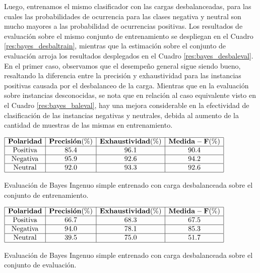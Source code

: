 
Luego, entrenamos el mismo clasificador con las cargas desbalanceadas, para las cuales las probabilidades de ocurrencia para las clases negativa y neutral son mucho mayores a las probabilidad de ocurrencias positivas. Los resultados de evaluaci\'on sobre el mismo conjunto de entrenamiento se despliegan en el Cuadro \ref{res:bayes_desbaltrain}, mientras que la estimaci\'on sobre el conjunto de evaluaci\'on arroja los resultados desplegados en el Cuadro \ref{res:bayes_desbaleval}. En el primer caso, observamos que el desempe\~no general sigue siendo bueno, resaltando la diferencia entre la precisi\'on y exhaustividad para las instancias positivas causada por el desbalanceo de la carga. Mientras que en la evaluaci\'on sobre instancias desconocidas, se nota que en relaci\'on al caso equivalente visto en el Cuadro \ref{res:bayes_baleval}, hay una mejora considerable en la efectividad de clasificaci\'on de las instancias negativas y neutrales, debida al aumento de la cantidad de muestras de las mismas en entrenamiento. 


\begin{table}[htb] 
\centering

$
\begin{array}{|c|c|c|c|}
      \hline
      \mathbf{Polaridad} & \mathbf{Precisi\acute{o}n(\%)} & \mathbf{Exhaustividad(\%)} & \mathbf{Medida-F(\%)}	\\
      \hline
      \mathrm{Positiva}  & 85.4	& 96.1 & 90.4	\\
      \hline
      \mathrm{Negativa}  & 95.9 & 92.6 & 94.2	\\
      \hline
      \mathrm{Neutral}	 & 92.0 & 93.3 & 92.6	\\
      \hline
\end{array}
$
\caption{Evaluaci\'on de Bayes Ingenuo simple entrenado con carga desbalanceada sobre el conjunto de entrenamiento.}
\label{res:bayes_desbaltrain}
\end{table}

\begin{table}[htb] 
\centering

$
\begin{array}{|c|c|c|c|}
      \hline
      \mathbf{Polaridad} & \mathbf{Precisi\acute{o}n(\%)} & \mathbf{Exhaustividad(\%)} & \mathbf{Medida-F(\%)}	\\
      \hline
      \mathrm{Positiva}  & 66.7	& 68.3 & 67.5 \\
      \hline
      \mathrm{Negativa}  & 94.0 & 78.1 & 85.3 \\
      \hline
      \mathrm{Neutral}	 & 39.5 & 75.0 & 51.7 \\
      \hline
\end{array}
$
\caption{Evaluaci\'on de Bayes Ingenuo simple entrenado con carga desbalanceada sobre el conjunto de evaluaci\'on.}
\label{res:bayes_desbaleval}
\end{table}

